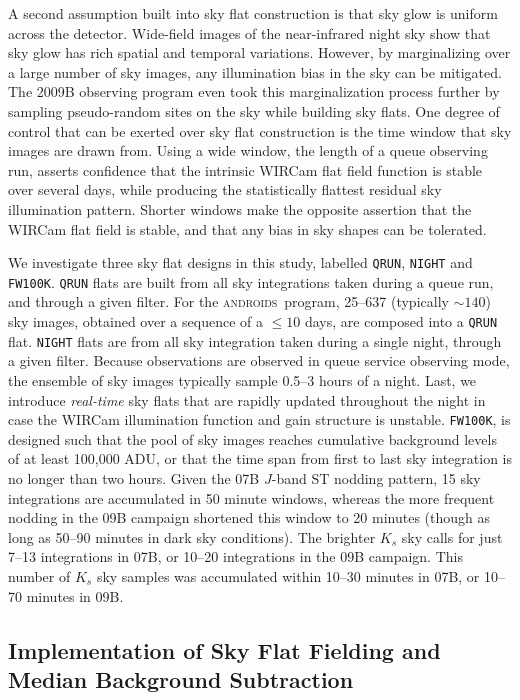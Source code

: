 \documentclass[iop]{emulateapj}
\newcommand{\androids}{\textsc{androids}}
\begin{document}
A second assumption built into sky flat construction is that sky glow is uniform across the detector.
Wide-field images of the near-infrared night sky show that sky glow has rich spatial and temporal variations.
However, by marginalizing over a large number of sky images, any illumination bias in the sky can be mitigated.
The 2009B observing program even took this marginalization process further by sampling pseudo-random sites on the sky while building sky flats. One degree of control that can be exerted over sky flat construction is the time window that sky images are drawn from.
Using a wide window, the length of a queue observing run, asserts confidence that the intrinsic WIRCam flat field function is stable over several days, while producing the statistically flattest residual sky illumination pattern.
Shorter windows make the opposite assertion that the WIRCam flat field is stable, and that any bias in sky shapes can be tolerated.

We investigate three sky flat designs in this study, labelled \texttt{QRUN}, \texttt{NIGHT} and \texttt{FW100K}.
\texttt{QRUN} flats are built from all sky integrations taken during a queue run, and through a given filter.
For the \androids\ program, 25--637 (typically $\sim 140$) sky images, obtained over a sequence of a $\leq 10$ days, are composed into a \texttt{QRUN} flat.
\texttt{NIGHT} flats are from all sky integration taken during a single night, through a given filter.
Because observations are observed in queue service observing mode, the ensemble of sky images typically sample 0.5--3 hours of a night.
Last, we introduce \emph{real-time} sky flats that are rapidly updated throughout the night in case the WIRCam illumination function and gain structure is unstable.
\texttt{FW100K}, is designed such that the pool of sky images reaches cumulative background levels of at least 100,000 ADU, or that the time span from first to last sky integration is no longer than two hours.
Given the 07B $J$-band ST nodding pattern, 15 sky integrations are accumulated in 50 minute windows, whereas the more frequent nodding in the 09B campaign shortened this window to 20 minutes (though as long as 50--90 minutes in dark sky conditions).
The brighter $K_s$ sky calls for just 7--13 integrations in 07B, or 10--20 integrations in the 09B campaign.
This number of $K_s$ sky samples was accumulated within 10--30 minutes in 07B, or 10--70 minutes in 09B.

\subsection{Implementation of Sky Flat Fielding and Median Background Subtraction}
\label{sec:flatbuilding}
\end{document}
